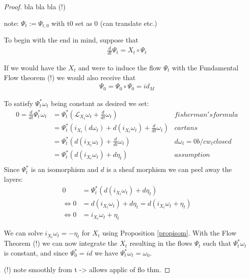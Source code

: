 \begin{proof}
bla bla bla (!)

note: $\Psi_t := \Psi_{t,0}$ with t0 set as 0 (can translate etc.)

To begin with the end in mind, suppose that
\begin{align*}
\frac{d}{dt} \Psi_t = X_t \circ \Psi_t
\end{align*}

If we would have the $X_t$ and were to induce the flow $\Psi_t$ with the Fundamental Flow theorem (!) we would also receive that
\begin{align*}
\Psi_0 = \Psi_0 \circ \Psi_0 = id_M
\end{align*}

To satisfy $\Psi^*_t \omega_t$ being constant as desired we set:
\begin{align*}
0 = \frac{d}{dt} \Psi^*_t \omega_t &= \Psi^*_t \left( \mathcal{L}_{X_t} \omega_t + \frac{d}{dt} \omega_t \right) &fisherman's formula \\
&= \Psi^*_t \left( i_{X_t}(d\omega_t) + d(i_{X_t}\omega_t)+\frac{d}{dt}\omega_t \right) & cartans \\
&= \Psi^*_t \left( d(i_{X_t}\omega_t)+\frac{d}{dt}\omega_t \right) & d\omega_t=0 b/c w_t closed \\
&= \Psi^*_t \left( d(i_{X_t}\omega_t)+d\eta_t  \right) & assumption \\
\end{align*}
Since $\Psi^*_t$ is an isomorphism and $d$ is a sheaf morphism we can peel away the layers:
\begin{align*}
0 &= \Psi^*_t \left( d(i_{X_t}\omega_t)+d\eta_t  \right) \\
\Leftrightarrow 0 &= d(i_{X_t}\omega_t)+d\eta_t = d(i_{X_t}\omega_t +\eta_t )\\
\Leftrightarrow 0 &= i_{X_t}\omega_t +\eta_t
\end{align*}

We can solve $i_{X_t}\omega_t = -\eta_t$ for $X_t$ using Proposition \ref{propisom}.  With the Flow Theorem (!) we can now integrate the $X_t$ resulting in the flows $\Psi_t$ such that $\Psi^*_t \omega_t$ is constant, and since $\Psi^*_0 = id$ we have $\Psi^*_t \omega_t = \omega_0$. 

(!) note smoothly from t -> allows applic of flo thm.
\end{proof}




